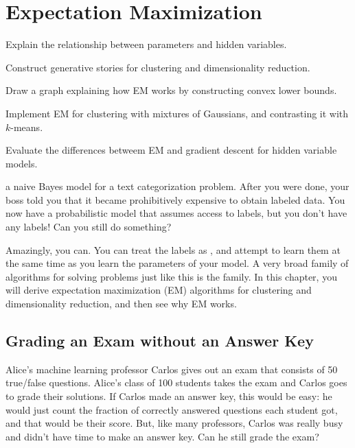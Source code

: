 \chapter{Expectation Maximization} \label{sec:em}


\begin{learningobjectives}
\item Explain the relationship between parameters and hidden
  variables.
\item Construct generative stories for clustering and dimensionality
  reduction.
\item Draw a graph explaining how EM works by constructing convex
  lower bounds.
\item Implement EM for clustering with mixtures of Gaussians, and
  contrasting it with $k$-means.
\item Evaluate the differences betweem EM and gradient descent for
  hidden variable models.
\end{learningobjectives}

\dependencies{}

 a naive Bayes model for a text
categorization problem.  After you were done, your boss told you that
it became prohibitively expensive to obtain labeled data.  You now
have a probabilistic model that assumes access to labels, but you
don't have any labels!  Can you still do something?

Amazingly, you can.  You can treat the labels as , and attempt to learn them at the same time as you learn
the parameters of your model.  A very broad family of algorithms for
solving problems just like this is the  family.  In this chapter, you will derive expectation
maximization (EM) algorithms for clustering and dimensionality reduction,
and then see why EM works.

\section{Grading an Exam without an Answer Key}

Alice's machine learning professor Carlos gives out an exam that consists of 50 true/false questions.
Alice's class of 100 students takes the exam and Carlos goes to grade their solutions.
If Carlos made an answer key, this would be easy: he would just count the fraction of correctly answered questions each student got, and that would be their score.
But, like many professors, Carlos was really busy and didn't have time to make an answer key.
Can he still grade the exam?

